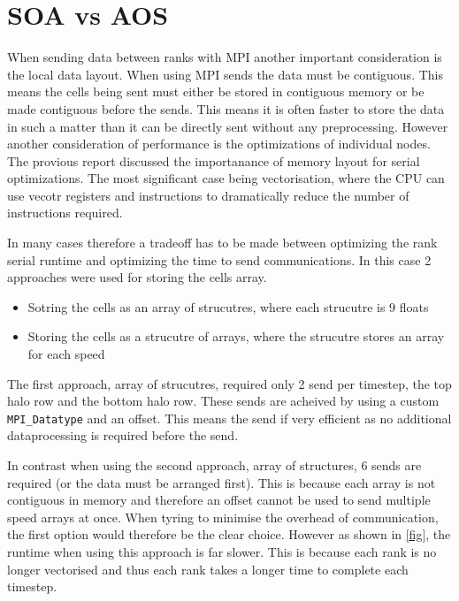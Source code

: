 \documentclass{article}
\begin{document}
\begin{multicols}{2}
\begin{center}
\begin{tikzpicture}[every node/.style={minimum size=.5cm-\pgflinewidth, outer sep=0pt}, scale=0.5]
\end{tikzpicture}
\label{fig:cells-regions-and-halos}
\end{center}


\section{SOA vs AOS}

When sending data between ranks with MPI another important consideration is the
local data layout.  When using MPI sends the data must be contiguous. This
means the cells being sent must either be stored in contiguous memory or be
made contiguous before the sends. This means it is often faster to store the
data in such a matter than it can be directly sent without any preprocessing.
However another consideration of performance is the optimizations of individual
nodes. The provious report discussed the importanance of memory layout for
serial optimizations. The most significant case being vectorisation, where the
CPU can use vecotr registers and instructions to dramatically reduce the number
of instructions required.

In many cases therefore a tradeoff has to be made between optimizing the rank
serial runtime and optimizing the time to send communications. In this case 2
approaches were used for storing the cells array. 

\begin{itemize}
    \item{Sotring the cells as an array of strucutres, where each strucutre is
        9 floats}
    \item{Storing the cells as a strucutre of arrays, where the strucutre
        stores an array for each speed}
\end{itemize}

The first approach, array of strucutres, required only 2 send per timestep, the
top halo row and the bottom halo row. These sends are acheived by using a
custom \verb|MPI_Datatype| and an offset. This means the send if very efficient
as no additional dataprocessing is required before the send.

In contrast when using the second approach, array of structures, 6 sends are
required (or the data must be arranged first). This is because each array is
not contiguous in memory and therefore an offset cannot be used to send
multiple speed arrays at once. When tyring to minimise the overhead of
communication, the first option would therefore be the clear choice. However as
shown in \autoref{fig}, the runtime when using this approach is far slower.
This is because each rank is no longer vectorised and thus each rank takes a
longer time to complete each timestep.


\end{multicols}
\end{document}
